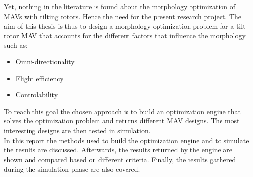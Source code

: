 Yet, nothing in the literature is found about the morphology optimization
of MAVs with tilting rotors. Hence the need for the present research project.
The aim of this thesis is thus to design a morphology optimization problem for
a tilt rotor MAV that accounts for the different factors that influence the
morphology such as:

\begin{itemize}
\item Omni-directionality
\item Flight efficiency
\item Controlability
\end{itemize}

To reach this goal the chosen approach is to build an optimization engine that solves
the optimization problem and returns different MAV designs. The most interesting
designs are then tested in simulation.\\
In this report the methods used to build the optimization engine and to simulate
the results are discussed. Afterwards, the results returned by the engine are shown
and compared based on different criteria. Finally, the results gathered during
the simulation phase are also covered.

